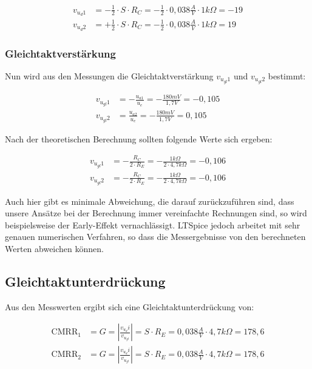 \documentclass{article}
\begin{document}
\begin{align*}
  v_{u_d1} &= - \frac{1}{2} \cdot S \cdot R_C = -\frac{1}{2} \cdot 0,038\frac{A}{V} \cdot 1k\Omega = -19 \\
  v_{u_d2} &= + \frac{1}{2} \cdot S \cdot R_C = -\frac{1}{2} \cdot 0,038\frac{A}{V} \cdot 1k\Omega = 19
\end{align*}

\subsubsection{Gleichtaktverstärkung}
Nun wird aus den Messungen die Gleichtaktverstärkung $v_{u_{gl}1}$ und $v_{u_{gl}2}$ bestimmt:

\begin{align*}
  v_{u_{gl}1} &= -\frac{u_{a1}}{u_e} = -\frac{180mV}{1,7V} = -0,105\\
  v_{u_{gl}2} &= \frac{u_{a2}}{u_e} = -\frac{180mV}{1,7V} = 0,105
\end{align*}

Nach der theoretischen Berechnung sollten folgende Werte sich ergeben:

\begin{align*}
  v_{u_{gl}1} &= -\frac{R_C}{2\cdot R_E} = -\frac{1k\Omega}{2\cdot 4,7k\Omega} = -0,106\\
  v_{u_{gl}2} &= -\frac{R_C}{2\cdot R_E} = -\frac{1k\Omega}{2\cdot 4,7k\Omega} = -0,106
\end{align*}

Auch hier gibt es minimale Abweichung, die darauf zurückzuführen sind, dass unsere Ansätze bei der Berechnung immer vereinfachte Rechnungen sind, so wird beispielsweise der Early-Effekt vernachlässigt.
LTSpice jedoch arbeitet mit sehr genauen numerischen Verfahren, so dass die Messergebnisse von den berechneten Werten abweichen können.

\subsection{Gleichtaktunterdrückung}

Aus den Messwerten ergibt sich eine Gleichtaktunterdrückung von:

\begin{align*}
  \mathrm{CMRR}_1 &= G = |\frac{v_{u_d}i}{v_{u_{gl}}}| = S \cdot R_E = 0,038 \frac{A}{V}\cdot 4,7k\Omega = 178,6 \\
  \mathrm{CMRR}_2 &= G = |\frac{v_{u_d}i}{v_{u_{gl}}}| = S \cdot R_E = 0,038 \frac{A}{V}\cdot 4,7k\Omega = 178,6
 \end{align*}
\end{document}
